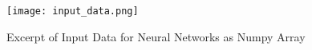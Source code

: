 \begin{figure}[H]
\begin{center}
\texttt{[image: input\_data.png]}
\end{center}
\caption{Excerpt of Input Data for Neural Networks as Numpy Array}
\label{fig:inpud_data}
\end{figure}














